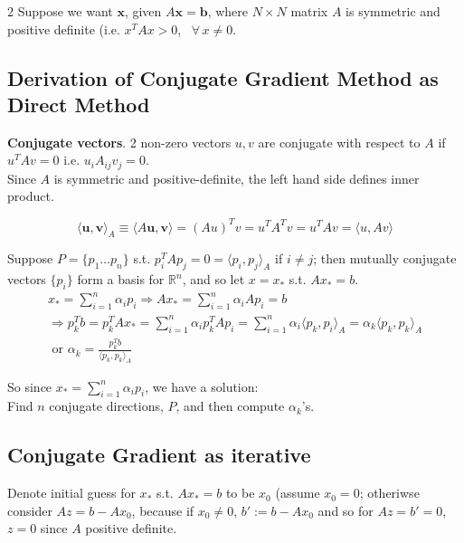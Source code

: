 \documentclass[10pt]{amsart}
\begin{document}
\begin{multicols*}{2}
Suppose we want $\mathbf{x}$, given $A \mathbf{x} = \mathbf{b}$, where $N\times N$ matrix $A$ is symmetric and positive definite (i.e. $x^T A x> 0$, \, $\forall \, x \neq 0$.

\subsection{Derivation of Conjugate Gradient Method as Direct Method}

\textbf{Conjugate vectors}. 2 non-zero vectors $u, v$ are conjugate with respect to $A$ if $u^T Av = 0$ i.e. $u_i A_{ij} v_j =0$. \\

Since $A$ is symmetric and positive-definite, the left hand side defines inner product.

\begin{equation}
\langle \mathbf{u}, \mathbf{v} \rangle_A \equiv \langle A\mathbf{u}, \mathbf{v} \rangle = (Au)^T v = u^T A^T v = u^T A v = \langle u, Av \rangle
\end{equation}

Suppose $P = \lbrace p_1 \dots p_n \rbrace$ s.t. $p_i^T A p_j = 0 = \langle p_i , p_j \rangle_A$ if $i\neq j$; then mutually conjugate vectors $\lbrace p_i \rbrace$ form a basis for $\mathbb{R}^n$, and so let $x= x_*$ s.t. $Ax_* =b$. \\

\[
\begin{gathered}
	x_* = \sum_{i=1}^n \alpha_i p_i \Longrightarrow Ax_* = \sum_{i=1}^n \alpha_i A p_i = b \\
	\Longrightarrow p_k^T b = p_k^T Ax_* = \sum_{i=1}^n \alpha_i p_k^T A p_i = \sum_{i=1}^n \alpha_i \langle p_k, p_i \rangle_A = \alpha_k \langle p_k , p_k \rangle_A \\
\text{ or } \alpha_k = \frac{p_k^T b}{ \langle p_k , p_k \rangle_A }
\end{gathered}
\]

So since $x_* = \sum_{i=1}^n \alpha_i p_i $, we have a solution: \\
Find $n$ conjugate directions, $P$, and then compute $\alpha_k$'s. \\

\subsection{Conjugate Gradient as iterative}

Denote initial guess for $x_*$ s.t. $Ax_* =b$ to be $x_0$ (assume $x_0 =0$; otheriwse consider $Az=b-Ax_0$, because if $x_0 \neq 0$, $b':= b-Ax_0$ and so for $A z = b' = 0$, $z=0$ since $A$ positive definite.


\end{multicols*}
\end{document}
